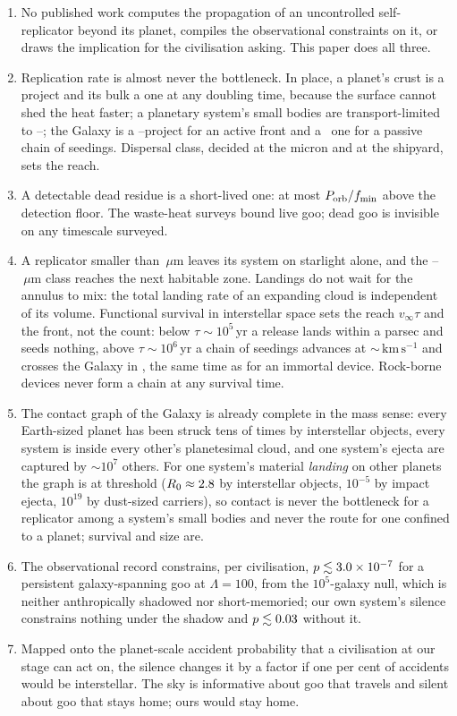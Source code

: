 \documentclass[11pt]{article}
\newcommand{\um}{\ensuremath{\,\mu\mathrm{m}}\xspace}
\newcommand{\kms}{\ensuremath{\,\mathrm{km\,s^{-1}}}\xspace}
\begin{document}
\begin{enumerate}
\item No published work computes the propagation of an uncontrolled
self-replicator beyond its planet, compiles the observational constraints on
it, or draws the implication for the civilisation asking.  This paper does
all three.
\item Replication rate is almost never the bottleneck.  In place, a planet's
crust is a \CrustGovTime project and its bulk a \BulkGovTime one at any
doubling time, because the surface cannot shed the heat faster; a planetary
system's small bodies are transport-limited to \BeltConvTime--\KuiperConvTime;
the Galaxy is a \FillFastFast--\FillSlowSlow project for an active front and
a \SurvGrainTGalInf\ one for a passive chain of seedings.  Dispersal class,
decided at the micron and at the shipyard, sets the reach.
\item A detectable dead residue is a short-lived one: at most
$P_{\rm orb}/f_{\min}$ above the detection floor.  The waste-heat surveys bound
live goo; dead goo is invisible on any timescale surveyed.
\item A replicator smaller than \BlowoutRadiusUm\um leaves its system on
starlight alone, and the \WindowLoUm--\WindowHiUm\um class reaches the next
habitable zone.  Landings do not wait for the annulus to mix: the total
landing rate of an expanding cloud is independent of its volume.  Functional
survival in interstellar space sets the reach $v_\infty\tau$ and the front,
not the count: below $\tau\sim10^{5}$\,yr a release lands within a parsec and
seeds nothing, above $\tau\sim10^{6}$\,yr a chain of seedings advances at
$\sim$\SurvGrainVFront\kms and crosses the Galaxy in \SurvGrainTGalInf, the
same time as for an immortal device.  Rock-borne devices never form a chain
at any survival time.
\item The contact graph of the Galaxy is already complete in the mass sense:
every Earth-sized planet has been struck tens of times by interstellar
objects, every system is inside every other's planetesimal cloud, and one
system's ejecta are captured by $\sim10^{7}$ others.  For one system's material
\emph{landing} on other planets the graph is at threshold
($R_{0}\approx2.8$ by interstellar objects, $10^{-5}$ by impact
ejecta, $10^{19}$ by dust-sized carriers), so contact is never the bottleneck
for a replicator among a system's small bodies and never the route for one
confined to a planet; survival and size are.
\item The observational record constrains, per civilisation,
$p\lesssim3.0\times10^{-7}$ for a persistent galaxy-spanning goo at
$\Lambda=100$, from the $10^{5}$-galaxy null, which is neither anthropically
shadowed nor short-memoried; our own system's silence constrains nothing under
the shadow and $p\lesssim0.03$ without it.
\item Mapped onto the planet-scale accident probability that a civilisation at
our stage can act on, the silence changes it by a factor \BranchRatioTypical
if one per cent of accidents would be interstellar.  The sky is informative
about goo that travels and silent about goo that stays home; ours would stay
home.
\end{enumerate}
\end{document}
